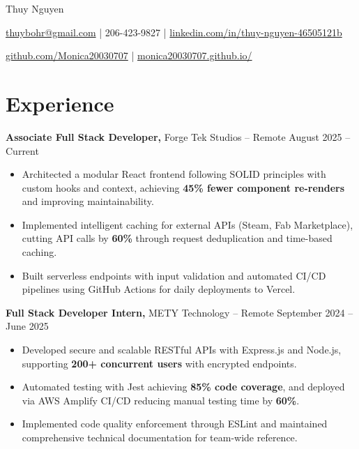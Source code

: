 \documentclass[11pt]{article}       %
\begin{document}
\centerline{\Huge Thuy Nguyen}

\vspace{5pt}

\centerline{\href{mailto:thuybohr@gmail.com}{thuybohr@gmail.com} | 206-423-9827 |
\href{https://www.linkedin.com/in/thuy-nguyen-46505121b/}{linkedin.com/in/thuy-nguyen-46505121b}}

\centerline{\href{https://github.com/Monica20030707}{github.com/Monica20030707} | 
\href{https://monica20030707.github.io/}{monica20030707.github.io/}} 

\vspace{-9pt}

\section*{Experience}

\textbf{Associate Full Stack Developer,} {Forge Tek Studios} -- Remote \hfill August 2025 -- Current \\
\vspace{-9pt}
\begin{itemize}
  \item Architected a modular React frontend following SOLID principles with custom hooks and context, achieving \textbf{45\% fewer component re-renders} and improving maintainability.
  \item Implemented intelligent caching for external APIs (Steam, Fab Marketplace), cutting API calls by \textbf{60\%} through request deduplication and time-based caching.
  \item Built serverless endpoints with input validation and automated CI/CD pipelines using GitHub Actions for daily deployments to Vercel.
\end{itemize}

\textbf{Full Stack Developer Intern,} {METY Technology} -- Remote \hfill September 2024 -- June 2025 \\
\vspace{-9pt}
\begin{itemize}
  \item Developed secure and scalable RESTful APIs with Express.js and Node.js, supporting \textbf{200+ concurrent users} with encrypted endpoints.
  \item Automated testing with Jest achieving \textbf{85\% code coverage}, and deployed via AWS Amplify CI/CD reducing manual testing time by \textbf{60\%}.
  \item Implemented code quality enforcement through ESLint and maintained comprehensive technical documentation for team-wide reference.
\end{itemize}
\end{document}
